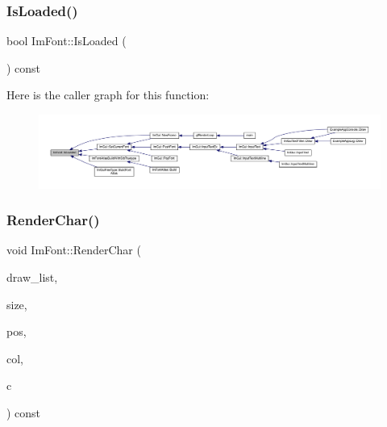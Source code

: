 \mbox{\label{struct_im_font_a97dafa61cc94e84be396d69b0d42b1ce}} 
\subsubsection{\texorpdfstring{Is\+Loaded()}{IsLoaded()}}
{\footnotesize\ttfamily bool Im\+Font\+::\+Is\+Loaded (\begin{DoxyParamCaption}{ }\end{DoxyParamCaption}) const\hspace{0.3cm}{\ttfamily [inline]}}

Here is the caller graph for this function\+:
\nopagebreak
\begin{figure}[H]
\begin{center}
\leavevmode
\includegraphics[width=350pt]{struct_im_font_a97dafa61cc94e84be396d69b0d42b1ce_icgraph}
\end{center}
\end{figure}
\mbox{\label{struct_im_font_aa8370ddcf8d3e4e034d07de9e00fcdd1}} 
\subsubsection{\texorpdfstring{Render\+Char()}{RenderChar()}}
{\footnotesize\ttfamily void Im\+Font\+::\+Render\+Char (\begin{DoxyParamCaption}\item[{\mbox{\hyperlink{struct_im_draw_list}{Im\+Draw\+List}} $\ast$}]{draw\+\_\+list,  }\item[{float}]{size,  }\item[{\mbox{\hyperlink{struct_im_vec2}{Im\+Vec2}}}]{pos,  }\item[{\mbox{\hyperlink{imgui_8h_a118cff4eeb8d00e7d07ce3d6460eed36}{Im\+U32}}}]{col,  }\item[{\mbox{\hyperlink{imgui_8h_af2c7badaf05a0008e15ef76d40875e97}{Im\+Wchar}}}]{c }\end{DoxyParamCaption}) const}

